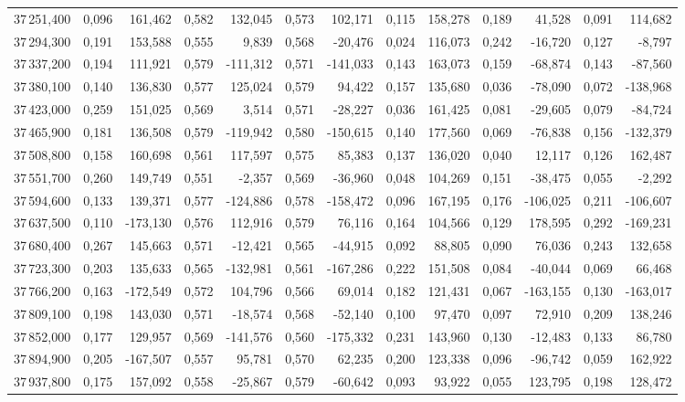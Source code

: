 \begin{longtable}{rrrrrrrrrrrrr}
37\,251,400 & 0,096 & 161,462 & 0,582 & 132,045 & 0,573 & 102,171 & 0,115 & 158,278 & 0,189 & 41,528 & 0,091 & 114,682\\
37\,294,300 & 0,191 & 153,588 & 0,555 & 9,839 & 0,568 & -20,476 & 0,024 & 116,073 & 0,242 & -16,720 & 0,127 & -8,797\\
37\,337,200 & 0,194 & 111,921 & 0,579 & -111,312 & 0,571 & -141,033 & 0,143 & 163,073 & 0,159 & -68,874 & 0,143 & -87,560\\
37\,380,100 & 0,140 & 136,830 & 0,577 & 125,024 & 0,579 & 94,422 & 0,157 & 135,680 & 0,036 & -78,090 & 0,072 & -138,968\\
37\,423,000 & 0,259 & 151,025 & 0,569 & 3,514 & 0,571 & -28,227 & 0,036 & 161,425 & 0,081 & -29,605 & 0,079 & -84,724\\
37\,465,900 & 0,181 & 136,508 & 0,579 & -119,942 & 0,580 & -150,615 & 0,140 & 177,560 & 0,069 & -76,838 & 0,156 & -132,379\\
37\,508,800 & 0,158 & 160,698 & 0,561 & 117,597 & 0,575 & 85,383 & 0,137 & 136,020 & 0,040 & 12,117 & 0,126 & 162,487\\
37\,551,700 & 0,260 & 149,749 & 0,551 & -2,357 & 0,569 & -36,960 & 0,048 & 104,269 & 0,151 & -38,475 & 0,055 & -2,292\\
37\,594,600 & 0,133 & 139,371 & 0,577 & -124,886 & 0,578 & -158,472 & 0,096 & 167,195 & 0,176 & -106,025 & 0,211 & -106,607\\
37\,637,500 & 0,110 & -173,130 & 0,576 & 112,916 & 0,579 & 76,116 & 0,164 & 104,566 & 0,129 & 178,595 & 0,292 & -169,231\\
37\,680,400 & 0,267 & 145,663 & 0,571 & -12,421 & 0,565 & -44,915 & 0,092 & 88,805 & 0,090 & 76,036 & 0,243 & 132,658\\
37\,723,300 & 0,203 & 135,633 & 0,565 & -132,981 & 0,561 & -167,286 & 0,222 & 151,508 & 0,084 & -40,044 & 0,069 & 66,468\\
37\,766,200 & 0,163 & -172,549 & 0,572 & 104,796 & 0,566 & 69,014 & 0,182 & 121,431 & 0,067 & -163,155 & 0,130 & -163,017\\
37\,809,100 & 0,198 & 143,030 & 0,571 & -18,574 & 0,568 & -52,140 & 0,100 & 97,470 & 0,097 & 72,910 & 0,209 & 138,246\\
37\,852,000 & 0,177 & 129,957 & 0,569 & -141,576 & 0,560 & -175,332 & 0,231 & 143,960 & 0,130 & -12,483 & 0,133 & 86,780\\
37\,894,900 & 0,205 & -167,507 & 0,557 & 95,781 & 0,570 & 62,235 & 0,200 & 123,338 & 0,096 & -96,742 & 0,059 & 162,922\\
37\,937,800 & 0,175 & 157,092 & 0,558 & -25,867 & 0,579 & -60,642 & 0,093 & 93,922 & 0,055 & 123,795 & 0,198 & 128,472\\

\end{longtable}
